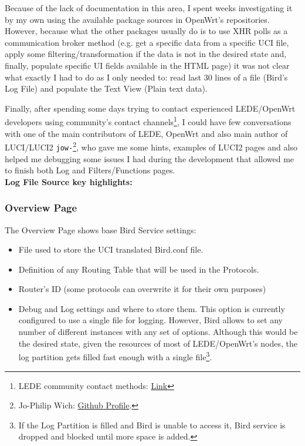 Because of the lack of documentation in this area, I spent weeks investigating it by my own using the available package sources in OpenWrt's repositories. However, because what the other packages usually do is to use XHR polls as a communication broker method (e.g. get a specific data from a specific UCI file, apply some filtering/transformation if the data is not in the desired state and, finally, populate specific UI fields available in the HTML page) it was not clear what exactly I had to do as I only needed to: read last 30 lines of a file (Bird's Log File) and populate the Text View (Plain text data).

Finally, after spending some days trying to contact experienced LEDE/OpenWrt developers using community's contact channels\footnote{LEDE community contact methods: \href{https://lede-project.org/contact}{Link}}, I could have few conversations with one of the main contributors of LEDE, OpenWrt and also main author of LUCI/LUCI2 \texttt{jow-}\footnote{Jo-Philip Wich: \href{https://github.com/jow-}{Github Profile}.}, who gave me some hints, examples of LUCI2 pages and also helped me debugging some issues I had during the development that allowed me to finish both Log and Filters/Functions pages.\\

\textbf{Log File Source key highlights:}



\subsubsection{Overview Page}
The Overview Page shows base Bird Service settings:

\begin{itemize}
    \item File used to store the UCI translated Bird.conf file.
    \item Definition of any Routing Table that will be used in the Protocols.
    \item Router's ID (some protocols can overwrite it for their own purposes)
    \item Debug and Log settings and where to store them.
    This option is currently configured to use a single file for logging. However, Bird allows to set any number of different instances with any set of options. Although this would be the desired state, given the resources of most of LEDE/OpenWrt's nodes, the log partition gets filled fast enough with a single file\footnote{If the Log Partition is filled and Bird is unable to access it, Bird service is dropped and blocked until more space is added.}.
\end{itemize}

